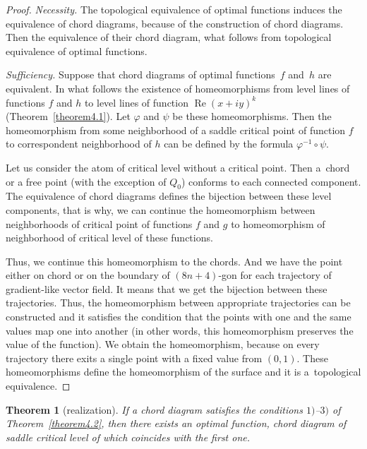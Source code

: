\documentclass[pdftex]{sigma}
\numberwithin{equation}{section}
\newtheorem{Theorem}{Theorem}[section]
\begin{document}
\begin{proof}
\emph{Necessity.} The topological equivalence of optimal functions induces the equivalence of chord diagrams, because of the construction of chord diagrams. Then the equivalence of their chord diagram, what follows from topological equivalence of optimal functions.

\emph{Sufficiency.} Suppose that chord diagrams of optimal functions~$f$ and~$h$ are equivalent. In what follows the existence of homeomorphisms from level lines of functions $f$ and $h$ to level lines of function $\operatorname{Re}(x+iy)^{k}$ (Theorem~\ref{theorem4.1}). Let $\varphi$ and $\psi$ be these homeomorphisms. Then the homeomorphism from some neighborhood of a saddle critical point of function $f$ to correspondent neighborhood of $h$ can be def\/ined by the formula $\varphi^{-1}\circ\psi$.

Let us consider the atom of critical level without a critical point. Then a~chord or a free point (with the exception of $Q_0$) conforms to each connected component. The equivalence of chord diagrams def\/ines the bijection between these level components, that is why, we can continue the homeomorphism between neighborhoods of critical point of functions $f$ and $g$ to homeomorphism of neighborhood of critical level of these functions.

Thus, we continue this homeomorphism to the chords. And we have the point either on chord or on the boundary of $(8n+4)$-gon for each trajectory of gradient-like vector f\/ield. It means that we get the bijection between these trajectories. Thus, the homeomorphism between appropriate trajectories can be constructed and it satisf\/ies the condition that the points with one and the same values map one into another (in other words, this homeomorphism preserves the value of the function). We obtain the homeomorphism, because on every trajectory there exits a single point with a f\/ixed value from $(0,1)$. These homeomorphisms def\/ine the homeomorphism of the surface and it is a~topological equivalence.
\end{proof}

\begin{Theorem}[realization]\label{theorem4.4}
If a chord diagram satisfies the conditions $1)$--$3)$ of Theorem~{\rm \ref{theorem4.2}}, then there exists an optimal function, chord diagram of saddle critical level of which coincides with the first one.
\end{Theorem}
\end{document}
